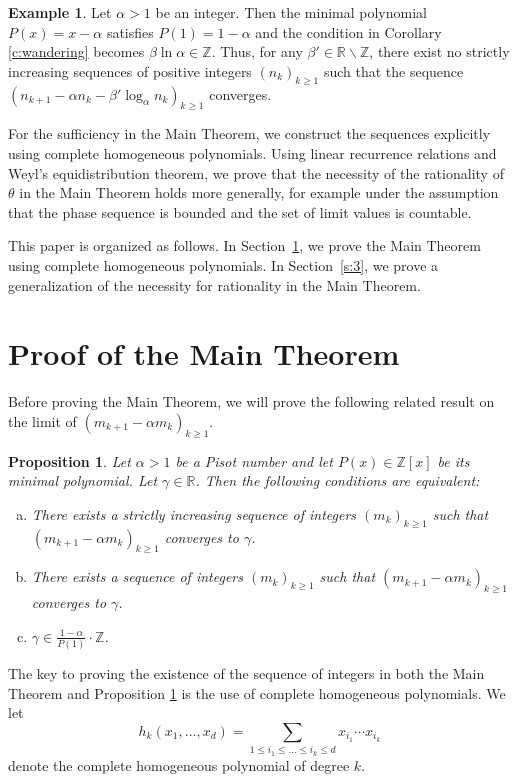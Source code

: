 \documentclass[12pt,centertags,oneside]{amsart}
\newtheorem{prop}[theorem]{Proposition}
\theoremstyle{definition}
\newtheorem{example}[theorem]{Example}
\newcommand{\R}{\mathbb{R}}
\newcommand{\Z}{\mathbb{Z}}
\renewcommand{\le}{\leqslant}
\renewcommand{\ge}{\geqslant}
\begin{document}
\begin{example} 
Let $\alpha>1$ be an integer. Then the minimal polynomial $P(x)=x-\alpha$ 
satisfies $P(1)=1-\alpha$ and the condition in Corollary \ref{c:wandering} 
becomes $\beta\ln \alpha \in \Z$. Thus, for any $\beta'\in \R\backslash 
\Z$, there exist no strictly increasing sequences of positive integers 
$(n_k)_{k\geqslant 1}$ such that the sequence $(n_{k+1}-\alpha 
n_k-\beta'\log_\alpha n_k)_{k\geqslant 1}$ converges. 
\end{example}

For the sufficiency in the Main Theorem, we construct the sequences 
explicitly using complete homogeneous polynomials. Using linear recurrence 
relations and Weyl's equidistribution theorem, we prove that the necessity of 
the rationality of $\theta$ in the Main Theorem holds more generally, for 
example under the assumption that the phase sequence is bounded and the set 
of limit values is countable.

This paper is organized as follows. In Section~\ref{s:2}, we prove the Main 
Theorem using complete homogeneous polynomials. In Section~\ref{s:3}, we 
prove a generalization of the necessity for rationality in the Main Theorem. 

\section{Proof of the Main Theorem}\label{s:2}

Before proving the Main Theorem, we will prove the following related result 
on the limit of $(m_{k+1}-\alpha m_k)_{k\ge 1}$. 

\begin{prop}\label{p:limit}
Let $\alpha>1$ be a Pisot number and let $P(x)\in \Z[x]$ be its minimal 
polynomial. Let $\gamma\in \R$. Then the following conditions are 
equivalent: 
\begin{enumerate}[(a)]
\item There exists a strictly increasing sequence of integers 
    $(m_k)_{k\ge 1}$ such that $(m_{k+1}-\alpha m_k)_{k\ge 1}$ converges 
    to $\gamma$. 
\item There exists a sequence of integers $(m_k)_{k\ge 1}$ such that 
    $(m_{k+1}-\alpha m_k)_{k\ge 1}$ converges to $\gamma$. 
\item $\gamma\in \frac{1-\alpha}{P(1)}\cdot\Z$. 
\end{enumerate}
\end{prop}

The key to proving the existence of the sequence of integers in both the 
Main Theorem and Proposition \ref{p:limit} is the use of complete 
homogeneous polynomials. We let 
\[h_k(x_1,\dots,x_d)=\sum_{1\le i_1\le \dots\le i_k\le d} x_{i_1}\dotsm x_{i_k}\] 
denote the complete homogeneous polynomial of degree 
$k$. 
\end{document}

